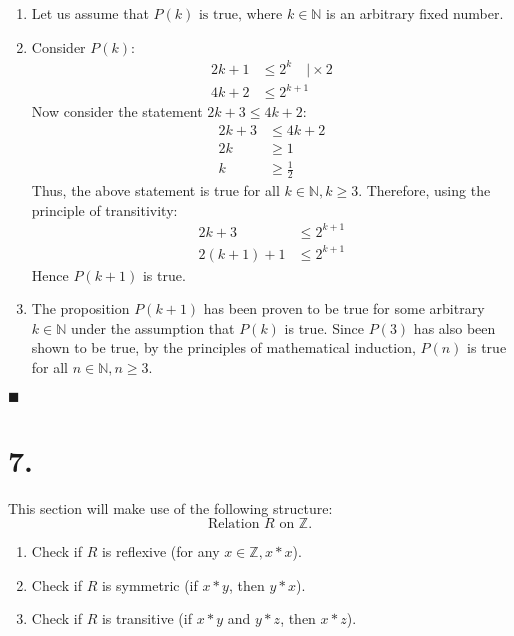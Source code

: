 \documentclass[12pt]{article}
\newcommand{\q}{\hfill $\blacksquare$}
\newenvironment{ps}
{\begin{enumerate}[leftmargin=0em, itemindent=1.5em]}
{\end{enumerate}}
\begin{document}
\begin{ps}
\begin{enumerate}[label=\arabic*.]
    \item Let us assume that \( P(k) \text{ is true, where } k \in \mathbb{N} \) is an arbitrary
        fixed number.

    \item Consider \( P(k) \):
    \begin{align*}
        2k + 1 &\leq 2^k \quad \biggr| \times 2 \\
        4k + 2 &\leq 2^{k+1}
    \end{align*}
    Now consider the statement \( 2k+3 \leq 4k + 2 \):
    \begin{align*}
        2k + 3 &\leq 4k + 2 \\
        2k &\geq 1 \\
        k &\geq \frac{1}{2}
    \end{align*}
    Thus, the above statement is true for all \( k \in \mathbb{N}, k \geq 3 \).
    Therefore, using the principle of transitivity:
    \begin{align*}
        2k+3 &\leq 2^{k+1} \\
        2(k+1) + 1 &\leq 2^{k+1}
    \end{align*}
    Hence \( P(k+1) \) is true.

    \item The proposition \( P(k+1) \) has been proven to be true for some arbitrary \( k \in
        \mathbb{N} \) under the assumption that \( P(k) \) is true. Since \( P(3) \) has also been
        shown to be true, by the principles of mathematical induction, \( P(n) \) is true for all \( n \in
        \mathbb{N}, n \geq 3 \).

    \end{enumerate} \q

\end{ps}

\section*{7.}
This section will make use of the following structure:
\[
    \text{Relation } R \text{ on } \mathbb{Z}.
\]   
\begin{enumerate}

    \item Check if \( R \) is reflexive (for any \(x \in \mathbb{Z}, x*x \)).
    \item Check if \( R \) is symmetric (if \( x*y \), then \( y*x \)).
    \item Check if \( R \) is transitive (if \( x*y \) and \( y*z \), then \( x*z \)).

\end{enumerate}
\end{document}
